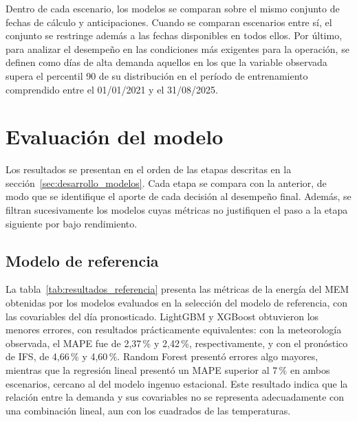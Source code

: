 Dentro de cada escenario, los modelos se comparan sobre el mismo conjunto de fechas de cálculo y anticipaciones. Cuando se comparan escenarios entre sí, el conjunto se restringe además a las fechas disponibles en todos ellos. Por último, para analizar el desempeño en las condiciones más exigentes para la operación, se definen como días de alta demanda aquellos en los que la variable observada supera el percentil 90 de su distribución en el período de entrenamiento comprendido entre el 01/01/2021 y el 31/08/2025.

\section{Evaluación del modelo}
\label{sec:evaluacion_modelo}

Los resultados se presentan en el orden de las etapas descritas en la sección~\ref{sec:desarrollo_modelos}. Cada etapa se compara con la anterior, de modo que se identifique el aporte de cada decisión al desempeño final. Además, se filtran sucesivamente los modelos cuyas métricas no justifiquen el paso a la etapa siguiente por bajo rendimiento.

\subsection{Modelo de referencia}
\label{subsec:resultados_referencia}

La tabla~\ref{tab:resultados_referencia} presenta las métricas de la energía del MEM obtenidas por los modelos evaluados en la selección del modelo de referencia, con las covariables del día pronosticado. LightGBM y XGBoost obtuvieron los menores errores, con resultados prácticamente equivalentes: con la meteorología observada, el MAPE fue de 2,37\,\% y 2,42\,\%, respectivamente, y con el pronóstico de IFS, de 4,66\,\% y 4,60\,\%. Random Forest presentó errores algo mayores, mientras que la regresión lineal presentó un MAPE superior al 7\,\% en ambos escenarios, cercano al del modelo ingenuo estacional. Este resultado indica que la relación entre la demanda y sus covariables no se representa adecuadamente con una combinación lineal, aun con los cuadrados de las temperaturas.

